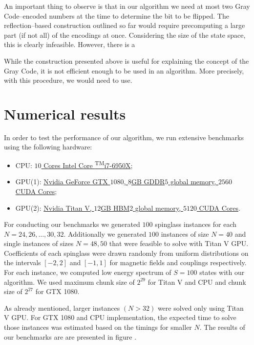 An important thing to observe is that in our algorithm we need at most two Gray
Code--encoded numbers at the time to determine the bit to be flipped. The
reflection--based construction outlined so far would require precomputing a
large part (if not all) of the encodings at once. Considering the size of the
state space, this is clearly infeasible. However, there is a

While the construction presented above is useful for explaining the concept of
the Gray Code, it is not efficient enough to be used in an algorithm. More
precisely, with this procedure, we would need to use.

\section{Numerical results}
In order to test the performance of our algorithm, we run extensive benchmarks
using the following hardware:
%
\begin{itemize}
  \item CPU:
    \href{https://ark.intel.com/products/94456/Intel-Core-i7-6950X-Processor-Extreme-Edition-25M-Cache-up-to-3-50-GHz-}{$10$
      Cores {\rmfamily Intel\textregistered} Core \textsuperscript{TM}i7-6950X};
  \item GPU(1):
    \href{https://www.nvidia.com/en-us/geforce/products/10series/geforce-gtx-1080}{Nvidia
      GeForce GTX $1080$, $8$GB GDDR$5$ global memory, $2560$ CUDA Cores};
  \item  GPU(2): \href{https://www.nvidia.com/en-us/titan/titan-v/}{Nvidia Titan V,
      $12$GB HBM$2$ global memory, $5120$ CUDA Cores}.
\end{itemize}

For conducting our benchmarks we generated $100$ spinglass instances for each
$N=24, 26, \ldots, 30, 32$. Additionally we generated $100$ instances of size
$N=40$ and single instances of sizes $N=48, 50$ that were feasible to solve
with Titan V GPU. Coefficients of each spinglass were drawn randomly from
uniform distributions on the intervals $[-2, 2]$ and $[-1, 1]$ for magnetic
fields and couplings respectively. For each instance, we computed low energy
spectrum of $S=100$ states with our algorithm. We used maximum chunk size of
$2^{29}$ for Titan V and CPU and chunk size of $2^{27}$ for GTX 1080.

As already mentioned, larger instances $(N > 32)$ were solved only using Titan
V GPU. For GTX 1080 and CPU implementation, the expected time to solve those
instances was estimated based on the timings for smaller $N$. The results of
our benchmarks are are presented in figure .

